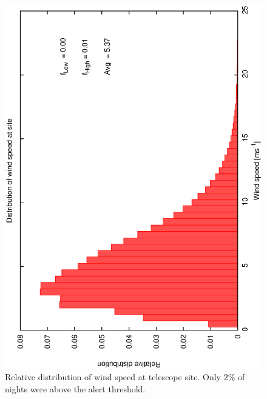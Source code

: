 \begin{figure}[htbp]
\begin{center}
    \includegraphics[scale=0.4, angle=-90]{figures/ecs/ws_25.dat.eps}
\caption[Relative distribution of wind speed at telescope site.]
{Relative distribution of wind speed at telescope site. Only 2\% of nights were above the alert threshold.}
\end{center} 
  \label{fig:met_windspeed_dist}
\end{figure}

